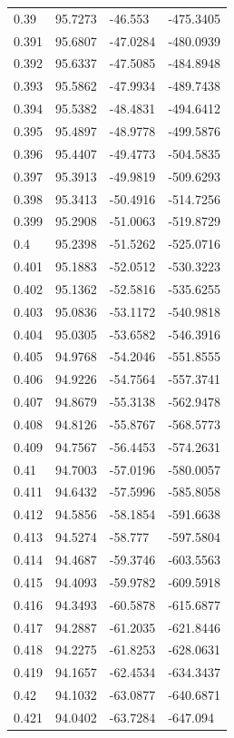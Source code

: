 \begin{tabular}{llll}
0.39 & 95.7273 & -46.553 & -475.3405 \\
0.391 & 95.6807 & -47.0284 & -480.0939 \\
0.392 & 95.6337 & -47.5085 & -484.8948 \\
0.393 & 95.5862 & -47.9934 & -489.7438 \\
0.394 & 95.5382 & -48.4831 & -494.6412 \\
0.395 & 95.4897 & -48.9778 & -499.5876 \\
0.396 & 95.4407 & -49.4773 & -504.5835 \\
0.397 & 95.3913 & -49.9819 & -509.6293 \\
0.398 & 95.3413 & -50.4916 & -514.7256 \\
0.399 & 95.2908 & -51.0063 & -519.8729 \\
0.4 & 95.2398 & -51.5262 & -525.0716 \\
0.401 & 95.1883 & -52.0512 & -530.3223 \\
0.402 & 95.1362 & -52.5816 & -535.6255 \\
0.403 & 95.0836 & -53.1172 & -540.9818 \\
0.404 & 95.0305 & -53.6582 & -546.3916 \\
0.405 & 94.9768 & -54.2046 & -551.8555 \\
0.406 & 94.9226 & -54.7564 & -557.3741 \\
0.407 & 94.8679 & -55.3138 & -562.9478 \\
0.408 & 94.8126 & -55.8767 & -568.5773 \\
0.409 & 94.7567 & -56.4453 & -574.2631 \\
0.41 & 94.7003 & -57.0196 & -580.0057 \\
0.411 & 94.6432 & -57.5996 & -585.8058 \\
0.412 & 94.5856 & -58.1854 & -591.6638 \\
0.413 & 94.5274 & -58.777 & -597.5804 \\
0.414 & 94.4687 & -59.3746 & -603.5563 \\
0.415 & 94.4093 & -59.9782 & -609.5918 \\
0.416 & 94.3493 & -60.5878 & -615.6877 \\
0.417 & 94.2887 & -61.2035 & -621.8446 \\
0.418 & 94.2275 & -61.8253 & -628.0631 \\
0.419 & 94.1657 & -62.4534 & -634.3437 \\
0.42 & 94.1032 & -63.0877 & -640.6871 \\
0.421 & 94.0402 & -63.7284 & -647.094 \\

\end{tabular}
